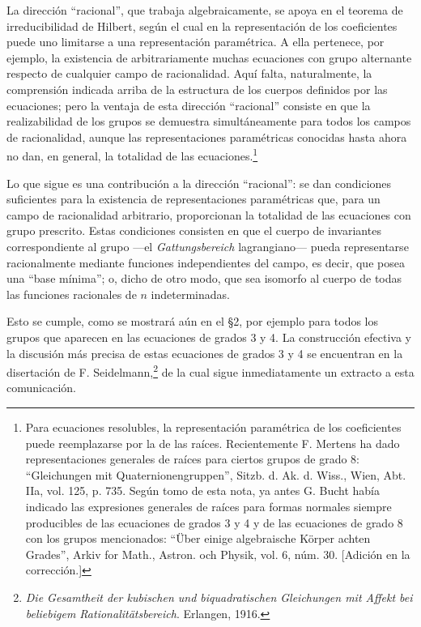 \documentclass[11pt]{article}
\begin{document}
La dirección ``racional'', que trabaja algebraicamente, se apoya en el teorema de irreducibilidad de Hilbert, según el cual en la representación de los coeficientes puede uno limitarse a una representación paramétrica. A ella pertenece, por ejemplo, la existencia de arbitrariamente muchas ecuaciones con grupo alternante respecto de cualquier campo de racionalidad. Aquí falta, naturalmente, la comprensión indicada arriba de la estructura de los cuerpos definidos por las ecuaciones; pero la ventaja de esta dirección ``racional'' consiste en que la realizabilidad de los grupos se demuestra simultáneamente para todos los campos de racionalidad, aunque las representaciones paramétricas conocidas hasta ahora no dan, en general, la totalidad de las ecuaciones.\footnote{Para ecuaciones resolubles, la representación paramétrica de los coeficientes puede reemplazarse por la de las raíces. Recientemente F. Mertens ha dado representaciones generales de raíces para ciertos grupos de grado 8: ``Gleichungen mit Quaternionengruppen'', Sitzb. d. Ak. d. Wiss., Wien, Abt. IIa, vol. 125, p. 735. Según tomo de esta nota, ya antes G. Bucht había indicado las expresiones generales de raíces para formas normales siempre producibles de las ecuaciones de grados 3 y 4 y de las ecuaciones de grado 8 con los grupos mencionados: ``Über einige algebraische Körper achten Grades'', Arkiv for Math., Astron. och Physik, vol. 6, núm. 30. [Adición en la corrección.]}

Lo que sigue es una contribución a la dirección ``racional'': se dan condiciones suficientes para la existencia de representaciones paramétricas que, para un campo de racionalidad arbitrario, proporcionan la totalidad de las ecuaciones con grupo prescrito. Estas condiciones consisten en que el cuerpo de invariantes correspondiente al grupo ---el \emph{Gattungsbereich} lagrangiano--- pueda representarse racionalmente mediante funciones independientes del campo, es decir, que posea una ``base mínima''; o, dicho de otro modo, que sea isomorfo al cuerpo de todas las funciones racionales de $n$ indeterminadas.

Esto se cumple, como se mostrará aún en el \S 2, por ejemplo para todos los grupos que aparecen en las ecuaciones de grados 3 y 4. La construcción efectiva y la discusión más precisa de estas ecuaciones de grados 3 y 4 se encuentran en la disertación de F. Seidelmann,\footnote{\emph{Die Gesamtheit der kubischen und biquadratischen Gleichungen mit Affekt bei beliebigem Rationalitätsbereich}. Erlangen, 1916.} de la cual sigue inmediatamente un extracto a esta comunicación.
\end{document}
